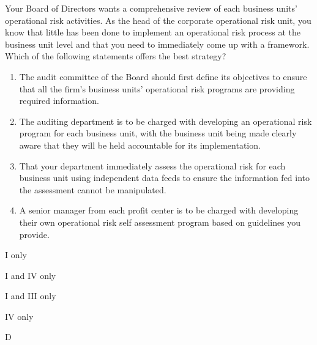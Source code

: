 \documentclass{article}
\newcounter{question} %
\begin{document}
\begin{question}
    Your Board of Directors wants a comprehensive review of each business units' operational risk activities. As the head of the corporate operational risk unit, you know that little has been done to implement an operational risk process at the business unit level and that you need to immediately come up with a framework. Which of the following statements offers the best strategy?
    \begin{enumerate}
        \item The audit committee of the Board should first define its objectives to ensure that all the firm's business units' operational risk programs are providing required information.
        \item The auditing department is to be charged with developing an operational risk program for each business unit, with the business unit being made clearly aware that they will be held accountable for its implementation.
        \item That your department immediately assess the operational risk for each business unit using independent data feeds to ensure the information fed into the assessment cannot be manipulated.
        \item A senior manager from each profit center is to be charged with developing their own operational risk self assessment program based on guidelines you provide.
    \end{enumerate}
\end{question}

\begin{choices}
    \item I only
    \item I and IV only
    \item I and III only
    \item IV only
\end{choices}

\begin{correctanswer}
    D
\end{correctanswer}
\end{document}
